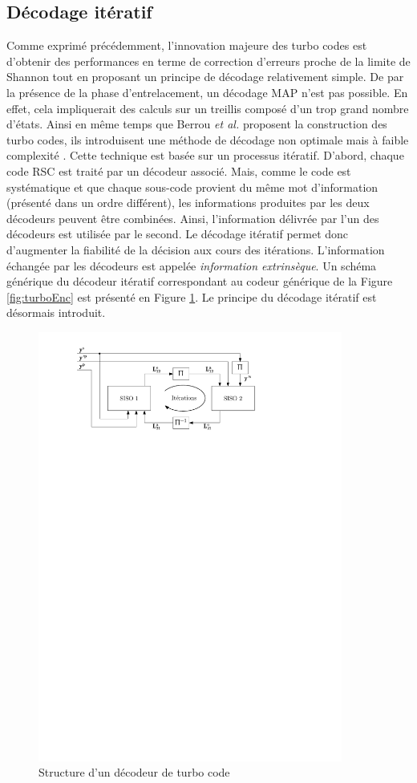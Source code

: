 \subsection{Décodage itératif}
Comme exprimé précédemment, l'innovation majeure des turbo codes est d'obtenir des performances en terme de correction d'erreurs proche de la limite de Shannon tout en proposant un principe de décodage relativement simple. De par la présence de la phase d'entrelacement, un décodage MAP n'est pas possible. En effet, cela impliquerait des calculs sur un treillis composé d'un trop grand nombre d'états. Ainsi en même temps que Berrou \textit{et al.} proposent la construction des turbo codes, ils introduisent une méthode de décodage non optimale mais à faible complexité \cite{berrouTC}. Cette technique est basée sur un processus itératif. D'abord, chaque code RSC est traité par un décodeur associé. Mais, comme le code est systématique et que chaque sous-code provient du même mot d'information (présenté dans un ordre différent), les informations produites par les deux décodeurs peuvent être combinées. Ainsi, l'information délivrée par l'un des décodeurs est utilisée par le second. Le décodage itératif permet donc d'augmenter la fiabilité de la décision aux cours des itérations. L'information échangée par les décodeurs est appelée \emph{information extrinsèque}. Un schéma générique du décodeur itératif correspondant au codeur générique de la Figure \ref{fig:turboEnc} est présenté en Figure \ref{fig:turboDec}. Le principe du décodage itératif est désormais introduit.

\begin{figure}[!h]
	\centering
	\includegraphics[width=10cm]{main/ch1_fig/TurboDec.pdf}
	\caption{\label{fig:turboDec} Structure d'un décodeur de turbo code}
\end{figure}

